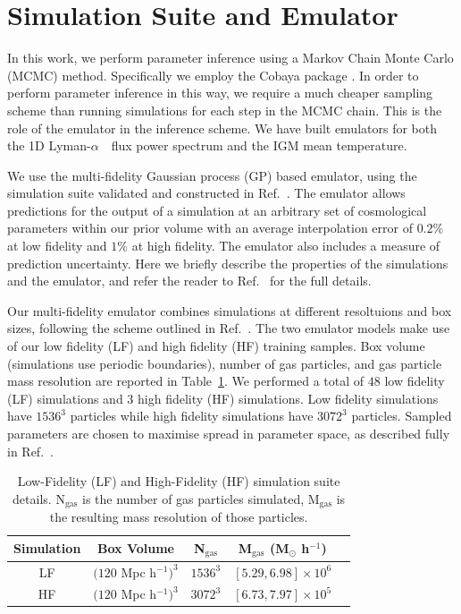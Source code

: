 \documentclass[a4paper,11pt]{article}
\newcommand{\Lya}{Lyman-$\alpha$\ }
\begin{document}
\section{Simulation Suite and Emulator}
\label{sec:emulator}
\label{sec:simulations}

In this work, we perform parameter inference using a Markov Chain Monte Carlo (MCMC) method.
Specifically we employ the Cobaya package \cite{2019ascl.soft10019T, 2021JCAP...05..057T}.
In order to perform parameter inference in this way, we require a much cheaper sampling scheme than running simulations for each step in the MCMC chain. This is the role of the emulator in the inference scheme. We have built emulators for both the 1D \Lya~flux power spectrum and the IGM mean temperature.

We use the multi-fidelity Gaussian process (GP) based emulator, using the simulation suite validated and constructed in Ref.~\cite{2023simsuite}. The emulator allows predictions for the output of a simulation at an arbitrary set of cosmological parameters within our prior volume with an average interpolation error of $0.2\%$ at low fidelity and $1\%$ at high fidelity. The emulator also includes a measure of prediction uncertainty. Here we briefly describe the properties of the simulations and the emulator, and refer the reader to Ref.~\cite{2023simsuite} for the full details.

Our multi-fidelity emulator combines simulations at different resoltuions and box sizes, following the scheme outlined in Ref.~\cite{2022MNRAS.517.3200F}. The two emulator models make use of our low fidelity (LF) and high fidelity (HF) training samples. Box volume (simulations use periodic boundaries), number of gas particles, and gas particle mass resolution are reported in Table~\ref{table:simulations}. We performed a total of $48$ low fidelity (LF) simulations and $3$ high fidelity (HF) simulations. Low fidelity simulations have  $1536^3$ particles while high fidelity simulations have $3072^3$ particles. Sampled parameters are chosen to maximise spread in parameter space, as described fully in Ref.~\cite{2023simsuite}.

\begin{table}[tbp]
	\centering
     \begin{tabular}{|c|c|c|c|c|}
		\hline
		Simulation & Box Volume & N$_{\text{gas}}$ & M$_{\text{gas}}$ (M$_{\odot}$ h$^{-1}$)\\
		\hline
		LF & $(120$ Mpc h$^{-1})^3$ & $1536^3$ & $[5.29, 6.98]\times10^6$\\
		HF & $(120$ Mpc h$^{-1})^3$ & $3072^3$ & $[6.73, 7.97]\times10^5$\\
		\hline
	\end{tabular}
    \caption{\label{table:simulations}
    Low-Fidelity (LF) and High-Fidelity (HF) simulation suite details.
    N$_{\text{gas}}$ is the number of gas particles simulated, M$_{\text{gas}}$ is the resulting mass resolution of those particles.}
\end{table}
\end{document}
